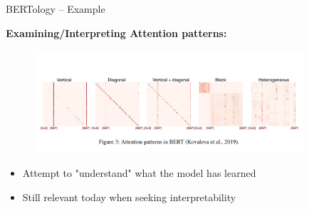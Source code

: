 \begin{frame}{BERTology -- Example}

\vfill

\textbf{Examining/Interpreting Attention patterns:}

\begin{figure}%
\includegraphics[width=10cm]{figure/att-pattern-bert.png}%
\end{figure}

\begin{itemize}
	\item Attempt to "understand" what the model has learned
	\item Still relevant today when seeking interpretability
\end{itemize}

\vfill

\end{frame}


\endlecture


